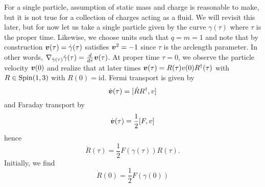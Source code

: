 For a single particle, assumption of static mass and charge is reasonable to make, but it is not true for a collection of charges acting as a fluid. We will revisit this later, but for now let us take a single particle given by the curve $\gamma(\tau)$ where $\tau$ is the proper time. Likewise, we choose units such that $q=m=1$ and note that by construction $\boldsymbol{v}(\tau)=\dot{\gamma}(\tau)$ satisfies $\boldsymbol{v}^2 = -1$ since $\tau$ is the arclength parameter. In other words, $\nabla_{\dot{\gamma}(\tau)}\dot{\gamma}(\tau)=\frac{d}{d\tau}\boldsymbol{v}(\tau)$. At proper time $\tau=0$, we observe the particle velocity $\boldsymbol{v}(0)$ and realize that at later times $\boldsymbol{v}(\tau)=R(\tau)v(0)R^\dagger(\tau)$ with $R\in \operatorname{Spin}(1,3)$ with $R(0)=\mathrm{id}$. Fermi transport is given by
\begin{equation}
    \dot{\boldsymbol{v}}(\tau) = [\dot{R}R^\dagger,v]
\end{equation}
and Faraday transport by
\begin{equation}
    \dot{\boldsymbol{v}}(\tau) = \frac{1}{2}[F,v]
\end{equation}
hence
\begin{equation}
\dot{R}(\tau) = \frac{1}{2}F(\gamma(\tau))R(\tau).
\end{equation}
Initially, we find
\begin{equation}
    \dot{R}(0)=\frac{1}{2}F(\gamma(0))
\end{equation}